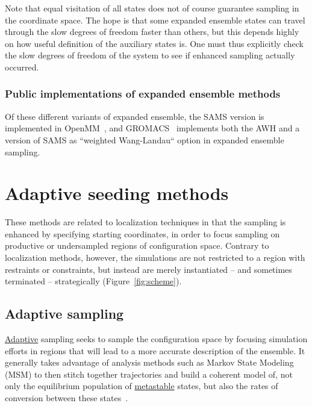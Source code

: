 \documentclass[9pt,review]{livecoms}
\begin{document}
Note that equal visitation of all states does not of course guarantee sampling in the coordinate space. The hope is that some expanded ensemble states can travel through the slow degrees of freedom faster than others, but this depends highly on how useful definition of the auxiliary states is. One must thus explicitly check the slow degrees of freedom of the system to see if enhanced sampling actually occurred.

\subsubsection{Public implementations of expanded ensemble methods}

Of these different variants of expanded ensemble, the SAMS version is implemented in OpenMM~\cite{10.1371/journal.pcbi.1005659}, and GROMACS~\cite{lindahl_2021} implements both the AWH and a version of SAMS as ``weighted Wang-Landau`` option in expanded ensemble sampling.

\section{Adaptive seeding methods}
\label{sec:seeding}

These methods are related to localization techniques in that the sampling is enhanced by specifying starting coordinates, in order to focus sampling on productive or undersampled regions of configuration space. Contrary to localization methods, however, the simulations are not restricted to a region with restraints or constraints, but instead are merely instantiated -- and sometimes terminated -- strategically (Figure~\ref{fig:scheme}).


\subsection{Adaptive sampling}
\hyperlink{ref:Adaptive} {Adaptive} sampling seeks to sample the configuration space by focusing simulation efforts in regions that will lead to a more accurate description of the ensemble. It generally takes advantage of analysis methods such as Markov State Modeling (MSM) to then stitch together trajectories and build a coherent model of, not only the equilibrium population of \hyperlink{ref:metastab} {metastable} states, but also the rates of conversion between these states~\cite{10.1007/978-94-007-7606-7,10.1021/jacs.7b12191}.
\end{document}
